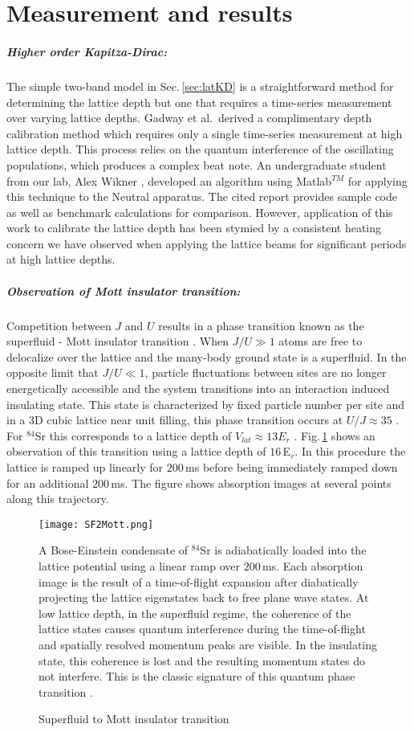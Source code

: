 \section{Measurement and results}
\subparagraph{Higher order Kapitza-Dirac:}
The simple two-band model in Sec.\,\ref{sec:latKD} is a straightforward method for determining the lattice depth but one that requires a time-series measurement over varying lattice depths.
Gadway et al.\,\cite{Gadway2009} derived a complimentary depth calibration method which requires only a single time-series measurement at high lattice depth.
This process relies on the quantum interference of the oscillating populations, which produces a complex beat note.
An undergraduate student from our lab, Alex Wikner \cite{Wikner2017}, developed an algorithm using Matlab$^{TM}$ for applying this technique to the Neutral apparatus.
The cited report provides sample code as well as benchmark calculations for comparison.
However, application of this work to calibrate the lattice depth has been stymied by a consistent heating concern we have observed when applying the lattice beams for significant periods at high lattice depths.

\subparagraph{Observation of Mott insulator transition:}
Competition between $J$ and $U$ results in a phase transition known as the superfluid - Mott insulator transition \cite{Fisher1989,gme02}.
When $J/U \gg 1$ atoms are free to delocalize over the lattice and the many-body ground state is a superfluid.
In the opposite limit that $J/U \ll 1$, particle fluctuations between sites are no longer energetically accessible and the system transitions into an interaction induced insulating state.
This state is characterized by fixed particle number per site and in a 3D cubic lattice near unit filling, this phase transition occurs at $U/J \approx 35$ \cite{Blakie2004}.
For $^{84}$Sr this corresponds to a lattice depth of $V_{lat} \approx 13E_r$ \cite{Fisher1989}.
Fig.\,\ref{fig:mottSFTransition} shows an observation of this transition using a lattice depth of $16$\,E$_r$.
In this procedure the lattice is ramped up linearly for $200\,$ms before being immediately ramped down for an additional $200\,$ms.
The figure shows absorption images at several points along this trajectory.
	\begin{figure} 
		\centerline{
		\texttt{[image: SF2Mott.png]}}
		\caption{Superfluid to Mott insulator transition}{A Bose-Einstein condensate of $^{84}$Sr is adiabatically loaded into the lattice potential using a linear ramp over $200$\,ms. Each absorption image is the result of a time-of-flight expansion after diabatically projecting the lattice eigenstates back to free plane wave states. At low lattice depth, in the superfluid regime, the coherence of the lattice states causes quantum interference during the time-of-flight and spatially resolved momentum peaks are visible. In the insulating state, this coherence is lost and the resulting momentum states do not interfere. This is the classic signature of this quantum phase transition \cite{gme02,gmh02}.}
		\label{fig:mottSFTransition}
	\end{figure}

